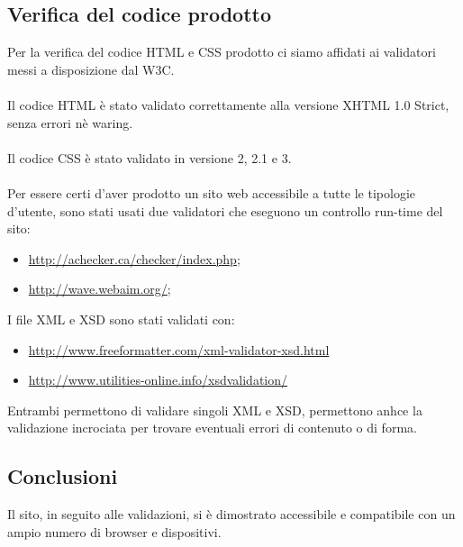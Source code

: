 {	\subsection{Verifica del codice prodotto}{
		Per la verifica del codice HTML e CSS prodotto ci siamo affidati ai validatori messi a disposizione dal W3C.\\
		\\
		Il codice HTML è stato validato correttamente alla versione XHTML 1.0 Strict, senza errori nè waring.\\
		\\
		Il codice CSS è stato validato in versione 2, 2.1 e 3.\\
		\\
		Per essere certi d'aver prodotto un sito web accessibile a tutte le tipologie d'utente, sono stati usati due validatori che eseguono un controllo run-time del sito:
		\begin{itemize}\itemsep1pt
			\item \url{http://achecker.ca/checker/index.php};
			\item \url{http://wave.webaim.org/};
		\end{itemize}
		I file XML e XSD sono stati validati con:
		\begin{itemize}\itemsep1pt
		\item \url{http://www.freeformatter.com/xml-validator-xsd.html}
		\item \url{http://www.utilities-online.info/xsdvalidation/}
		\end{itemize}
		Entrambi permettono di validare singoli XML e XSD, permettono anhce la validazione incrociata per trovare eventuali errori di contenuto o di forma.
	}
	\subsection{Conclusioni}
		Il sito, in seguito alle validazioni, si è dimostrato accessibile e compatibile con un ampio numero di browser e dispositivi.
}
